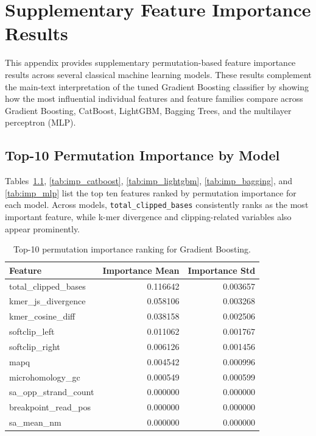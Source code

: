 
\chapter{Supplementary Feature Importance Results}
\label{app:supp_feature_importance}

This appendix provides supplementary permutation-based feature importance results across several classical machine learning models. These results complement the main-text interpretation of the tuned Gradient Boosting classifier by showing how the most influential individual features and feature families compare across Gradient Boosting, CatBoost, LightGBM, Bagging Trees, and the multilayer perceptron (MLP).

\section{Top-10 Permutation Importance by Model}
\label{app:top10_importance_models}

Tables~\ref{tab:imp_gb}, \ref{tab:imp_catboost}, \ref{tab:imp_lightgbm}, \ref{tab:imp_bagging}, and \ref{tab:imp_mlp} list the top ten features ranked by permutation importance for each model. Across models, \texttt{total\_clipped\_bases} consistently ranks as the most important feature, while k-mer divergence and clipping-related variables also appear prominently.

\begin{table}[H]
\centering
\small
\caption{Top-10 permutation importance ranking for Gradient Boosting.}
\label{tab:imp_gb}
\begin{tabular}{lrr}
\toprule
Feature & Importance Mean & Importance Std \\
\midrule
total\_clipped\_bases & 0.116642 & 0.003657 \\
kmer\_js\_divergence & 0.058106 & 0.003268 \\
kmer\_cosine\_diff & 0.038158 & 0.002506 \\
softclip\_left & 0.011062 & 0.001767 \\
softclip\_right & 0.006126 & 0.001456 \\
mapq & 0.004542 & 0.000996 \\
microhomology\_gc & 0.000549 & 0.000599 \\
sa\_opp\_strand\_count & 0.000000 & 0.000000 \\
breakpoint\_read\_pos & 0.000000 & 0.000000 \\
sa\_mean\_nm & 0.000000 & 0.000000 \\
\bottomrule
\end{tabular}
\end{table}

